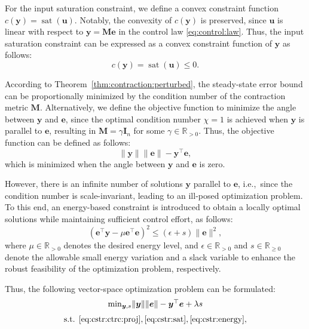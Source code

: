 \documentclass{ifacconf}
\newcommand\ie{\textrm{i.e.,\ }}
\newcommand\R{\mathbb{R}}
\newcommand*{\mv}[1]{\boldsymbol{#1}} %
\newcommand*{\mm}[1]{\boldsymbol{#1}} %
\newcommand*{\norm}[1]{\lVert #1 \rVert} %
\DeclareMathOperator{\mysat}{{sat}}       %
\begin{document}
For the input saturation constraint, we define a convex constraint function $c(\mv{y})=\mysat(\mv{u})$.
Notably, the convexity of $c(\mv{y})$ is preserved, since $\mv{u}$ is linear with respect to $\mv{y}=\mm{M}\mv{e}$ in the control law \eqref{eq:control:law}.
Thus, the input saturation constraint can be expressed as a convex constraint function of $\mv{y}$ as follows:
\begin{equation} \label{eq:cstr:sat}
   c(\mv{y})
   =
   \mysat(\mv{u})  
   \le 0
   .
\end{equation}

According to Theorem~\ref{thm:contraction:perturbed}, the steady-state error bound can be proportionally minimized by the condition number of the contraction metric $\mm{M}$.
Alternatively, we define the objective function to minimize the angle between $\mv{y}$ and $\mv{e}$, since the optimal condition number $\chi=1$ is achieved when $\mv{y}$ is parallel to $\mv{e}$, resulting in $\mm{M}=\gamma \mm{I}_n$ for some $\gamma\in\R_{>0}$.
Thus, the objective function can be defined as follows:
\begin{equation} \label{eq:obj:angle}
   \norm{\mv{y}}\norm{\mv{e}} - \mv{y}^\top \mv{e}
   ,
\end{equation}
which is minimized when the angle between $\mv{y}$ and $\mv{e}$ is zero.

However, there is an infinite number of solutions $\mv{y}$ parallel to $\mv{e}$, \ie since the condition number is scale-invariant, leading to an ill-posed optimization problem.
To this end, an energy-based constraint is introduced to obtain a locally optimal solutions while maintaining sufficient control effort, as follows:
\begin{equation} \label{eq:cstr:energy}
   \left(
      \mv{e}^\top \mv{y} 
      -
      \mu \mv{e}^\top \mv{e}
   \right)^2
   \le
   (\epsilon + s) \norm{\mv{e}}^2
   ,
\end{equation}
where $\mu\in\R_{>0}$ denotes the desired energy level, and $\epsilon\in\R_{>0}$ and $s\in\R_{\ge0}$ denote the allowable small energy variation and a slack variable to enhance the robust feasibility of the optimization problem, respectively.

Thus, the following vector-space optimization problem can be formulated:
\begin{equation} \label{eq:opt:main}
   \begin{matrix}
      \min_{
         \mv{y},s
         } 
      \norm{\mv{y}}\norm{\mv{e}} - \mv{y}^\top \mv{e}
      +
      \lambda s
      \\ 
      \vspace{-.2cm}
      \\
      \text{s.t. }
         \eqref{eq:cstr:ctrc:proj}
         ,
         \eqref{eq:cstr:sat}
         ,
         \eqref{eq:cstr:energy}
         ,
   \end{matrix}
\end{equation}
\end{document}
